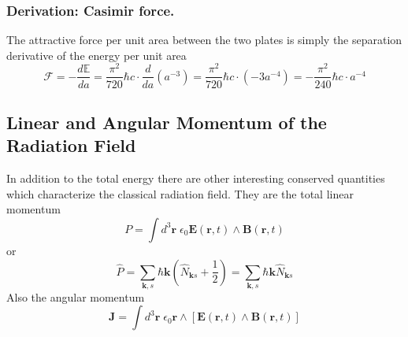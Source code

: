 \documentclass[../../../main.tex]{subfiles}
\begin{document}
\subsubsection{Derivation: Casimir force.}
The attractive force per unit area between the two plates is simply the separation derivative of the energy per unit area
\begin{equation*}
  \mathcal{F}=-\frac{d \mathbb{E}}{da} = \frac{\pi^{2}}{720} \hbar c \cdot \frac{d}{da} \left( a^{-3} \right) = \frac{\pi^{2}}{720} \hbar c \cdot \left( -3 a^{-4} \right) = -\frac{\pi^{2}}{240} \hbar c \cdot a^{-4}
\end{equation*}

\subsection{Linear and Angular Momentum of the Radiation Field}
In addition to the total energy there are other interesting conserved quantities which characterize the classical radiation ﬁeld. 
They are the total linear momentum
\begin{equation*}
P = \int d^3 \mathbf{r} \; \epsilon_0 \mathbf{E}(\mathbf{r}, t) \wedge \mathbf{B}(\mathbf{r}, t)
\end{equation*}
or 
\begin{equation*}
\hat{P} = \sum_{\mathbf{k },s} \hbar \mathbf{k} \left( \hat{N}_{\mathbf{k} s} + \frac{1}{2} \right) 
= \sum_{\mathbf{k },s} \hbar \mathbf{k} \hat{N}_{\mathbf{k} s}  
\end{equation*}
Also the angular momentum
\begin{equation*}
  \mathbf{J} = \int d^3 \mathbf{r} \; \epsilon_0 \mathbf{r} \wedge \left[ \mathbf{E}(\mathbf{r}, t) \wedge \mathbf{B}(\mathbf{r}, t) \right] 
\end{equation*}
\end{document}
